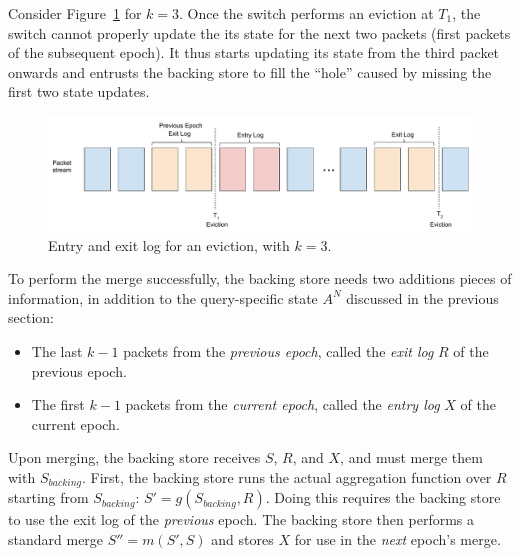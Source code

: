 Consider Figure~\ref{fig:bph-merge} for $k = 3$. Once the switch performs an eviction at $T_1$,
the switch cannot properly update the its state for the next two packets (first packets of the subsequent epoch).
It thus starts updating its state from the third packet onwards and entrusts the backing store to
fill the ``hole'' caused by missing the first two state updates.

\begin{figure}[h]
\centering
\includegraphics[width=0.7\linewidth]{pq_merge_tr_bph.pdf}
\caption{Entry and exit log for an eviction, with $k = 3$.}
\label{fig:bph-merge}
\end{figure}

To perform the merge successfully,
the backing
store needs two additions pieces of information, 
in addition to the query-specific state $A^N$ discussed in the previous section:
\begin{itemize}
\item The last $k-1$ packets from the \emph{previous epoch}, called the \emph{exit log} $R$ of the previous epoch.
\item The first $k-1$ packets from the \emph{current epoch}, called the \emph{entry log} $X$ of the current epoch. 
\end{itemize}

Upon merging, the backing store receives $S$, $R$, and $X$, and must merge them with $S_{backing}$. First, the backing store runs the actual aggregation function over $R$ starting from $S_{backing}$: $S' = g(S_{backing}, R)$. Doing this requires the backing store to use the exit log of the \emph{previous} epoch. The backing store then performs a standard merge
 $S'' = m(S', S)$ and stores $X$ for use in the \emph{next} epoch's merge.
